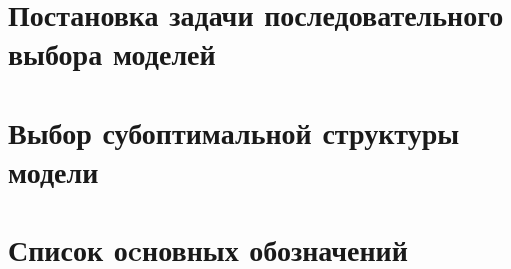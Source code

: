 \documentclass{dissert}
\theoremstyle{definition}
\begin{document}


\tableofcontents{}%

\clearpage

\chapter{Постановка задачи последовательного выбора моделей}

\iffalse
\clearpage
\chapter{Выбор модели с использованием вариационного вывода}


\clearpage


\chapter{Оптимизация гиперпараметров в задаче выбора модели}

\clearpage
\fi
\chapter{Выбор субоптимальной структуры модели}

\iffalse
\clearpage
\chapter{Анализ прикладных задач порождения и выбора моделей глубокого обучения}

\fi

\clearpage
{}



\clearpage


\chapter*{Список оcновных обозначений}

\clearpage 
 
\listoffigures

\clearpage
{}
\listoftables

\clearpage

\renewcommand{\bibname}{Список использованных источников}


\end{document}
